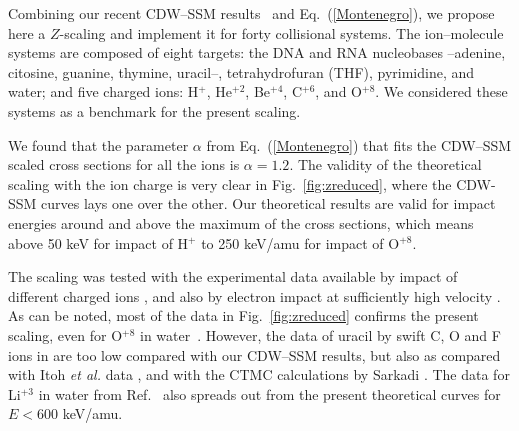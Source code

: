 \documentclass[10pt,showpacs,showkeys,twocolumn]{revtex4}
\begin{document}
 
Combining our recent CDW--SSM results~\cite{MendezJPB20} and Eq.~(\ref{Montenegro}), we propose here a $Z$-scaling and implement it for forty collisional systems. The ion--molecule systems are composed of eight targets: the DNA and RNA nucleobases --adenine, citosine, guanine, thymine, uracil--, tetrahydrofuran (THF), pyrimidine, and water; and five charged ions: H$^+$, He$^{+2}$, Be$^{+4}$, C$^{+6}$, and O$^{+8}$. We considered these systems as a benchmark for the present scaling. 


We found that the parameter $\alpha$ from Eq.~(\ref{Montenegro}) that fits the CDW--SSM scaled cross sections for all the ions is $\alpha=1.2$. 
The validity of the theoretical scaling with the ion charge is very clear in Fig.~\ref{fig:zreduced}, where the CDW-SSM curves lays one over the other.  Our theoretical results are valid for impact energies around and above the maximum of the cross sections, which means above 50 keV for impact of H$^+$  to 250 keV/amu for impact of O$^{+8}$. 

The scaling was tested with the experimental data available %
by impact of different charged ions \cite{itoh2013,iriki2011,wolff2014,wang2016,tribedi2019,agnihotri2012,agnihotri2013,Luna2007,Rudd86,Rudd85,Luna_Li_water,DalCappello2009,Tribedi_O_water},
and also by electron impact at sufficiently high velocity \cite{rahman2016,bug2017,wolf2019,fuss2009}. As can be noted, most of the data in Fig.~\ref{fig:zreduced} confirms the present scaling, even for O$^{+8}$ in water~\cite{Tribedi_O_water}. However, the data of uracil by swift C, O and F ions in \cite{agnihotri2012,agnihotri2013} are too low compared with our CDW--SSM results, but also as compared with Itoh \textit{et al.} data \cite{itoh2013}, and with the CTMC calculations by Sarkadi \cite{sarkadi2016}.
The data for Li$^{+3}$ in water from Ref.~\cite{Luna_Li_water} also spreads out from the present theoretical curves for $E<600$ keV/amu.






\end{document}

